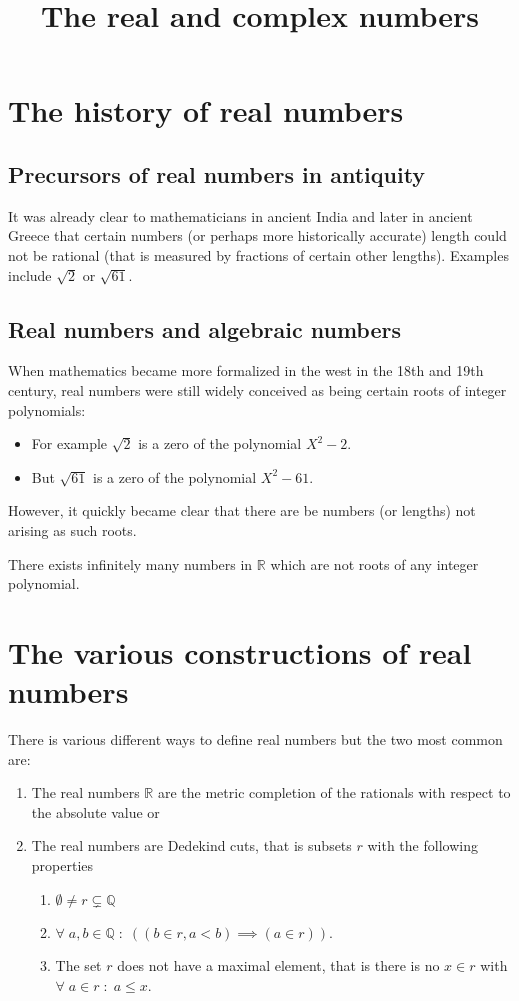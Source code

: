 \documentclass{article}
\title{The real and complex numbers}
\author{}
\newcommand{\R}{\mathbb{R}}
\newcommand{\Q}{\mathbb{Q}}
\begin{document}
\maketitle

\tableofcontents

\section{The history of real numbers}

\subsection{Precursors of real numbers in antiquity}
It was already clear to mathematicians in ancient India and later in ancient Greece that certain numbers (or perhaps more historically accurate) length could not be rational (that is measured by fractions of certain other lengths). Examples include $\sqrt2$ or $\sqrt{61}$.

\subsection{Real numbers and algebraic numbers}
\label{sec:1:2}
When mathematics became more formalized in the west in the 18th and 19th century, real numbers were still widely conceived as being certain roots of integer polynomials:

\begin{itemize}
    \item For example $\sqrt2$ is a zero of the polynomial $X^2-2$.
    \item But $\sqrt{61}$ is a zero of the polynomial $X^2-61$.
\end{itemize}

However, it quickly became clear that there are be numbers (or lengths) not arising as such roots.
\bigskip

There exists infinitely many numbers in $\mathbb{R}$ which are not roots of any integer polynomial.

\section{The various constructions of real numbers}
There is various different ways to define real numbers but the two most common are:
\begin{enumerate}
    \item The real numbers $\R$ are the metric completion of the rationals with respect to the absolute value or
    \item The real numbers are Dedekind cuts, that is subsets $r$ with the following properties
    \begin{enumerate}
        \item $\emptyset\neq r\subsetneq\Q$
        \item $\forall\;a,b\in\Q\;:\;((b\in r,a<b)\implies(a\in r))$.
        \item The set $r$ does not have a maximal element, that is there is no $x\in r$ with $\forall\;a\in r\;:\;a\leq x$.
    \end{enumerate}
\end{enumerate}
\end{document}
